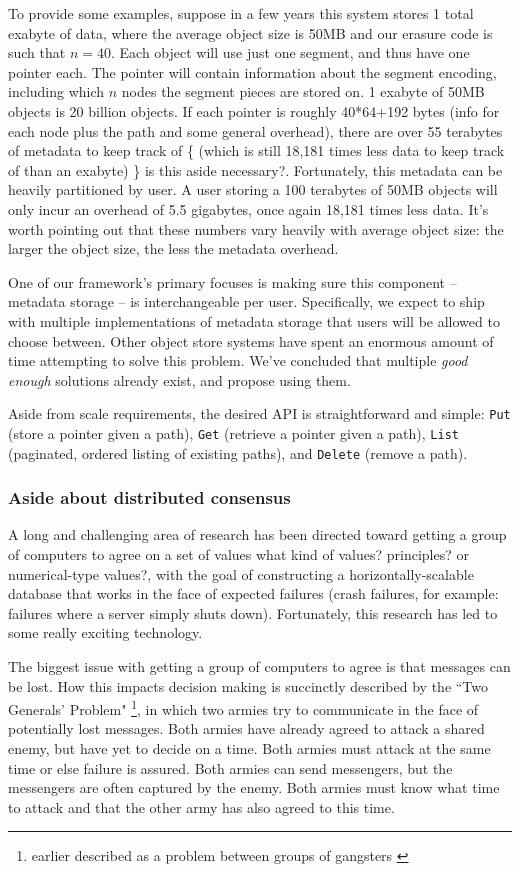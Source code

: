 \documentclass[a4paper,10pt]{article} \usepackage[utf8]{inputenc}
\newcommand{\x}[1]{{\tt #1}} \newcommand{\code}[1]{{\tt #1}}
\newcommand{\bs}[1]{{\color{red}#1}}
\begin{document}
To provide some examples, suppose in
a few years this system stores 1 total exabyte of data, where the average object
size is 50MB and our erasure code is such that $n=40$. Each object will use just
one segment, and thus have one pointer each. The pointer will contain
information about the segment encoding, including which $n$ nodes the segment
pieces are stored on. 1 exabyte of 50MB objects is 20 billion objects. If
each pointer is roughly 40*64+192 bytes (info for each node plus the path and
some general overhead), there are over 55 terabytes of metadata to keep track of
\bs{\{}
(which is still 18,181 times less data to keep track of than an exabyte)
\bs{\}}
\bs{is this aside necessary?}.
Fortunately, this metadata can be heavily partitioned by user. A user storing a
100 terabytes of 50MB objects will only incur an overhead of 5.5 gigabytes, once
again 18,181 times less data. It's worth pointing out that these numbers vary
heavily with average object size: the larger the object size, the less the
metadata overhead.

One of our framework's primary focuses is making sure this component -- metadata
storage -- is interchangeable per user. Specifically, we expect to ship with
multiple implementations of metadata storage that users will be allowed to
choose between. 
Other object store systems have spent an enormous amount of time 
attempting to solve this problem. 
We've concluded that multiple {\em good enough} solutions already
exist, and propose using them.

Aside from scale requirements, the desired API is straightforward and
simple: \x{Put} (store a pointer given a path), \x{Get} (retrieve a pointer
given a path), 
\x{List} (paginated, ordered listing of existing paths), 
and \x{Delete} (remove a path).

\subsubsection{Aside about distributed consensus}

A long and challenging area of research has been directed toward getting a
group of computers to agree on a set of values 
\bs{what kind of values? principles? or numerical-type values?}, 
with the goal of constructing a
horizontally-scalable database that works in the face of expected failures
(crash failures, for example: failures where a server simply shuts down).
Fortunately, this research has led to some really exciting technology.

The biggest issue with getting a group of computers to agree is that messages
can be lost. How this impacts decision making is succinctly described by the
``Two Generals' Problem" \cite{two-generals} \footnote{earlier described as a problem
between groups of gangsters \cite{two-gangsters}}, in which two armies try to
communicate in the face of potentially lost messages. Both armies have already
agreed to attack a shared enemy, but have yet to decide on a time. Both armies
must attack at the same time or else failure is assured. Both armies can send
messengers, but the messengers are often captured by the enemy. Both armies must
know what time to attack and that the other army has also agreed to this time.
\end{document}
